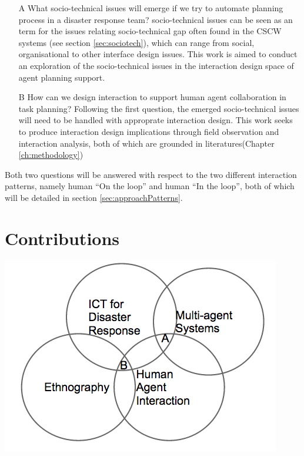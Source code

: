 \begin{enumerate}
\item[A] What socio-technical issues will emerge if we try to automate planning process in a disaster response team? socio-technical issues can be seen as an term for the issues relating socio-technical gap often found in the CSCW systems (see section \ref{sec:sociotech}), which can range from social, organisational to other interface design issues. This work is aimed to conduct an exploration of the socio-technical issues in the interaction design space of agent planning support.

\item[B] How can we design interaction to support human agent collaboration in task planning?
Following the first question, the emerged socio-technical issues will need to be handled with approprate interaction design. This work seeks to produce interaction design implications through field observation and interaction analysis, both of which are grounded in literatures(Chapter \ref{ch:methodology})
\end{enumerate}

Both two questions will be answered with respect to the two different interaction patterns, namely human ``On the loop'' and human ``In the loop'', both of which will be detailed in section \ref{sec:approachPatterns}. 

\section{Contributions} 
\includegraphics[scale=0.5]{img/contributions.png}

